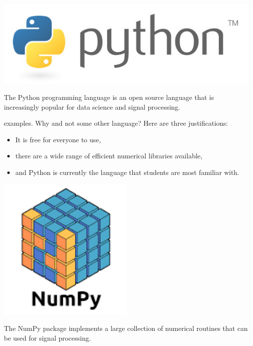 \begin{marginfigure}
  \includegraphics[width=\textwidth]{ch02/figures/pylogo.jpg}
  \caption{The Python programming language is an open source language that is increasingly popular for data science and signal processing.}
\end{marginfigure}

 examples. Why  and not some other
language? Here are three justifications:
\begin{itemize}
  \item It is free for everyone to use,
  \item there are a wide range of efficient numerical libraries available,
  \item and Python is currently the language that students are most familiar with.
\end{itemize}

\begin{marginfigure}
  \begin{center}
    \includegraphics[width=0.5\textwidth]{ch02/figures/numpylogo.png}
  \end{center}
  \caption{The NumPy package implements a large collection of numerical routines that can be used for signal processing.}
\end{marginfigure}

